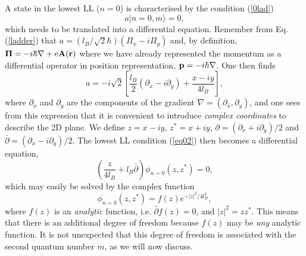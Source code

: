 \documentclass[10pt]{book}
\newcommand{\Pib}{\mbox{\boldmath $\Pi $}}
\newcommand{\bp}{{\bf p}}
\newcommand{\br}{{\bf r}}
\newcommand{\bA}{{\bf A}}
\newcommand{\beq}{\begin{equation}}
\newcommand{\eeq}{\end{equation}}
\begin{document}
A state in the lowest LL ($n=0$) is characterised by the condition (\ref{0lad})
\beq\label{eq02}
a |n=0,m\rangle = 0,
\eeq
which needs to be translated into a differential equation. Remember from Eq. (\ref{ladder}) that
$a = (l_B/\sqrt{2}\hbar)(\Pi_x - i\Pi_y)$ and, by definition, $\Pib= -i\hbar\nabla + e\bA(\br)$ where we have 
already represented the momentum as a differential operator in position representation, $\bp=-i\hbar\nabla$.
One then finds 
$$a=-i\sqrt{2}\left[\frac{l_B}{2}\left(\partial_x - i\partial_y\right)+\frac{x-iy}{4l_B}\right],$$
where $\partial_x$ and $\partial_y$ are the components of the gradient $\nabla=(\partial_x,\partial_y)$,
and one sees from this expression that it is convenient to introduce {\sl complex coordinates} to describe the 2D plane. We define
$z=x-iy$, $z^*=x+iy$, $\partial = (\partial_x + i\partial_y)/2$ and $\bar{\partial} = (\partial_x - i\partial_y)/2$.
The lowest LL condition (\ref{eq02}) then becomes a differential equation,
\beq\label{eq03}
\left(\frac{z}{4 l_B} + l_B\bar{\partial}\right) \phi_{n=0}(z,z^*) = 0,
\eeq
which may easily be solved by the complex function
\beq\label{eq04}
\phi_{n=0}(z,z^*) = f(z) e^{-|z|^2/4l_B^2},
\eeq
where $f(z)$ is an {\sl analytic} function, i.e. $\bar{\partial} f(z) = 0$, and $|z|^2=zz^*$. 
This means that there is an additional degree of freedom because 
$f(z)$ may be {\sl any} analytic function. It is not unexpected that this degree of freedom is associated with the second 
quantum number $m$, as we will now discuss.
\end{document}
